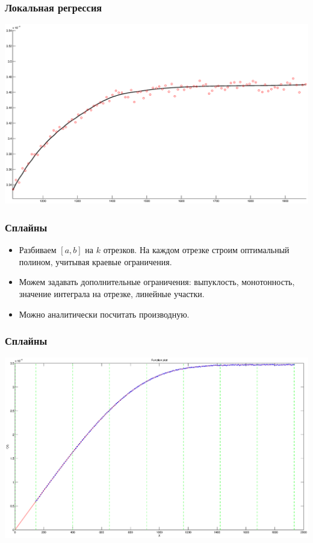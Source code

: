 \documentclass[smaller]{beamer}
\begin{document}
\begin{frame}
  \frametitle{Локальная регрессия}
\includegraphics[scale=0.2]{loc_regr_b.eps}
\end{frame}

\begin{frame}
  \frametitle{Сплайны}
  \begin{itemize}
    \item Разбиваем $[a,b]$ на $k$ отрезков. На каждом отрезке строим оптимальный полином,
    учитывая краевые ограничения.
    \item Можем задавать дополнительные ограничения: выпуклость, монотонность, значение интеграла на отрезке, линейные участки.
    \item Можно аналитически посчитать производную.
  \end{itemize}
\end{frame}

\begin{frame}
  \frametitle{Сплайны}
\includegraphics[scale=0.2]{spline.eps}
\end{frame}
\end{document}
